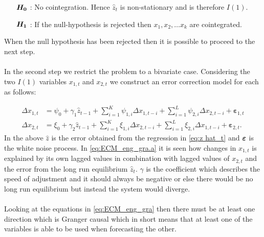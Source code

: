 \begin{itemize}
\centering
    \item[$\boldsymbol{H_0}$] : No cointegration. Hence $\hat{z}_t$ is non-stationary and is therefore $I(1)$.
    \item [$\boldsymbol{H_1}$] : If the null-hypothesis is rejected then $x_1,x_2,\ldots x_k$  are cointegrated.
\end{itemize}
When the null hypothesis has been rejected then it is possible to proceed to the next step.\\\\
In the second step we restrict the problem to a bivariate case. Considering the two $I(1)$ variables $x_{1,t}$ and $x_{2,t}$ we construct an error correction model for each as follows:

\begin{subequations}\label{eq:ECM_eng_gra}
\begin{align}
    \Delta x_{1,t} &= \psi_0 + \gamma_1 \hat{z}_{t-1} + \sum^K_{i=1} \psi_{1,i} \Delta x_{1,t-i} + \sum^L_{i=1} \psi_{2,i} \Delta x_{2,t-i} + \boldsymbol{\varepsilon}_{1,t} \label{eq:ECM_eng_gra.a} \\
    \Delta x_{2,t} &= \xi_0 + \gamma_2 \hat{z}_{t-1} + \sum^K_{i=1} \xi_{1,i} \Delta x_{2,t-i} + \sum^L_{i=1} \xi_{2,i} \Delta x_{1,t-i} + \boldsymbol{\varepsilon}_{2,t}. \label{eq:ECM_eng_gra.b}
\end{align}
\end{subequations}
In the above $\hat{z}$ is the error obtained from the regression in \eqref{eq:z hat_t} and $\boldsymbol{\varepsilon}$ is the white noise process. In \eqref{eq:ECM_eng_gra.a} it is seen how changes in $x_{1,t}$ is explained by its own lagged values in combination with lagged values of $x_{2,t}$ and the error from the long run equilibrium $\hat{z}_t$. $\gamma$ is the coefficient which describes the speed of adjustment and it should always be negative or else there would be no long run equilibrium but instead the system would diverge.\\\\
Looking at the equations in \eqref{eq:ECM_eng_gra} then there must be at least one direction which is Granger causal which in short means that at least one of the variables is able to be used when forecasting the other.


